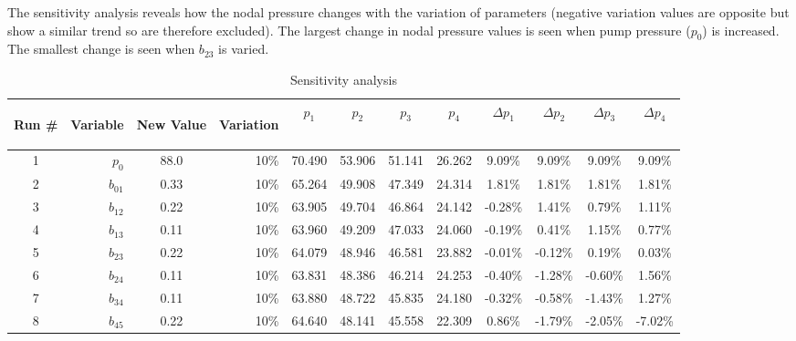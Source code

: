 \documentclass[titlepage,12pt,onehalfspacing]{article}
\begin{document}
The sensitivity analysis reveals how the nodal pressure changes with
the variation of parameters (negative variation values are opposite
but show a similar trend so are therefore excluded).  The largest
change in nodal pressure values is seen when pump pressure ($p_0$)
is increased.  The smallest change is seen when $b_{23}$ is varied.
\begin{table}[h]
\caption{Sensitivity analysis}
\begin{tabular}{|c|r|c|r|c|c|c|c|c|c|c|c|} \hline
{\begin{sideways}\bf Run \#\end{sideways}} & {\begin{sideways}\bf Variable\end{sideways}} & {\begin{sideways}\bf New Value\end{sideways}} & {\begin{sideways}\bf Variation\end{sideways}} & {\bf $p_1$} & {\bf $p_2$} & {\bf $p_3$} & {\bf $p_4$} & {\bf $\Delta p_1$} & {\bf $\Delta p_2$} & {\bf $\Delta p_3$} & {\bf $\Delta p_4$} \\
\hline
    1 & $p_0$ &  88.0 &  10\% & 70.490 & 53.906 & 51.141 & 26.262 & 9.09\% & 9.09\% & 9.09\% & 9.09\% \\
\hline
    2 & $b_{01}$ &  0.33 &  10\% & 65.264 & 49.908 & 47.349 & 24.314 & 1.81\% & 1.81\% & 1.81\% & 1.81\% \\
\hline
    3 & $b_{12}$ &  0.22 &  10\% & 63.905 & 49.704 & 46.864 & 24.142 & -0.28\% & 1.41\% & 0.79\% & 1.11\% \\
\hline
    4 & $b_{13}$ &  0.11 &  10\% & 63.960 & 49.209 & 47.033 & 24.060 & -0.19\% & 0.41\% & 1.15\% & 0.77\% \\
\hline
    5 & $b_{23}$ &  0.22 &  10\% & 64.079 & 48.946 & 46.581 & 23.882 & -0.01\% & -0.12\% & 0.19\% & 0.03\% \\
\hline
    6 & $b_{24}$ &  0.11 &  10\% & 63.831 & 48.386 & 46.214 & 24.253 & -0.40\% & -1.28\% & -0.60\% & 1.56\% \\
\hline
    7 & $b_{34}$ &  0.11 &  10\% & 63.880 & 48.722 & 45.835 & 24.180 & -0.32\% & -0.58\% & -1.43\% & 1.27\% \\
\hline
    8 & $b_{45}$ &  0.22 &  10\% & 64.640 & 48.141 & 45.558 & 22.309 & 0.86\% & -1.79\% & -2.05\% & -7.02\% \\
\hline
\end{tabular}
\end{table}
\end{document}
